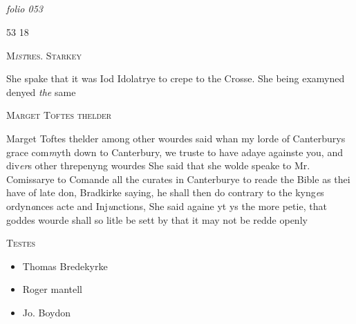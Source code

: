 \documentclass[12pt, a4paper]{book}
\begin{document}
\dotfill
					  \subsection*{}

\textit{folio 053}


\begin{flushright}{\color{Mahogany}53} 18\end{flushright}
 

                  
				\begin{center}  {\scshape M\textit{ist}res. Starkey}  \end{center}
			
 
		\ifthenelse{\isodd{\thepage}}
		{\reversemarginpar}
		{\normalmarginpar}
		She spake that it was Iod Idolatrye to crepe
 to the Crosse. She being examyned denyed \textit{the} same
 

               
               	
				\begin{center}  {\scshape Marget Toftes thelder}  \end{center}
			
               	
               		
		\ifthenelse{\isodd{\thepage}}
		{\reversemarginpar}
		{\normalmarginpar}
		Marget Toftes thelder among other wourdes said
               			whan my lorde of Canterburys grace com\textit{m}yth down
               			to Canterbury, we truste to have adaye againste
 you, and div\textit{er}s other threpenyng wourdes
 She said that she wolde speake to Mr. Comissarye
               			to Comande all the curates in Canterburye to reade
 the Bible as thei have of late don, Bradkirke
 saying, he shall then do contrary to the kyng\textit{e}s ordyn\textit{a}nces
 acte and Inj\textit{u}nctions, She said againe yt ys the
 more petie, that goddes wourde shall so litle be sett by
 that it may not be redde openly
               	
               	
               		
				\marginpar[\vspace{0.5cm}{\textcolor{Gray}{n}}]{}
			
               		\begin{center} {\scshape Testes} \end{center}\begin{itemize}
               			
				 \item[]Thomas Bredekyrke
               			\item[]Roger mantell
               			\item[]Jo. Boydon
               		\end{itemize}
               	
\end{document}

